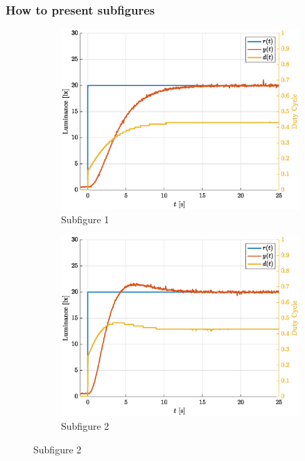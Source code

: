 \documentclass[12pt]{article}
\begin{document}
\subsubsection{How to present subfigures}

\begin{figure}[H]
    \centering
    \begin{subfigure}{0.33\textwidth}
        \includegraphics[width=\linewidth]{Images/Subimage1.eps}
        \caption{Subfigure 1}
        \label{fig:2.1}
    \end{subfigure}%
    \begin{subfigure}{0.33\textwidth}
        \includegraphics[width=\linewidth]{Images/Subimage2.eps}
        \caption{Subfigure 2}

\end{subfigure}
\end{figure}
\end{document}
